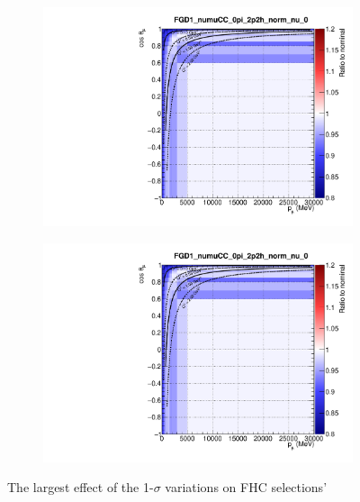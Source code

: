 \begin{figure}[!h]
\begin{subfigure}[t]{0.24\textwidth}
\includegraphics[width=\textwidth,page=11]{figures/mach3/sigmavar/Full_1sigmaVar_18July_BeRPA_U_ND280_sigmavar_highest_all}
\end{subfigure}
\begin{subfigure}[t]{0.24\textwidth}
\includegraphics[width=\textwidth,page=12]{figures/mach3/sigmavar/Full_1sigmaVar_18July_BeRPA_U_ND280_sigmavar_highest_all}
\end{subfigure}
\caption{The largest effect of the 1-$\sigma$ variations on FHC selections' \pmu \cosmu}
\label{fig:onesigma_fhc}
\end{figure}

